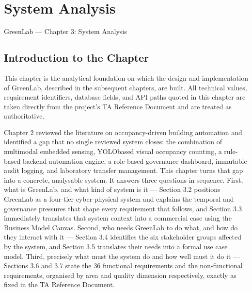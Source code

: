 
\chapter{System Analysis}
\label{ch:system-analysis}

GreenLab --- Chapter 3: System Analysis





\section{Introduction to the Chapter}

This chapter is the analytical foundation on which the design and implementation of GreenLab,
described in the subsequent chapters, are built. All technical values, requirement identifiers,
database fields, and API paths quoted in this chapter are taken directly from the project's TA
Reference Document and are treated as authoritative.

Chapter 2 reviewed the literature on occupancy-driven building automation and identified a gap
that no single reviewed system closes: the combination of multimodal embedded sensing, YOLObased visual occupancy counting, a rule-based backend automation engine, a role-based
governance dashboard, immutable audit logging, and laboratory transfer management. This chapter
turns that gap into a concrete, analysable system. It answers three questions in sequence. First,
what is GreenLab, and what kind of system is it --- Section 3.2 positions GreenLab as a four-tier
cyber-physical system and explains the temporal and governance pressures that shape every
requirement that follows, and Section 3.3 immediately translates that system context into a
commercial case using the Business Model Canvas. Second, who needs GreenLab to do what, and
how do they interact with it --- Section 3.4 identifies the six stakeholder groups affected by the
system, and Section 3.5 translates their needs into a formal use case model. Third, precisely what
must the system do and how well must it do it --- Sections 3.6 and 3.7 state the 36 functional
requirements and the non-functional requirements, organised by area and quality dimension
respectively, exactly as fixed in the TA Reference Document.


